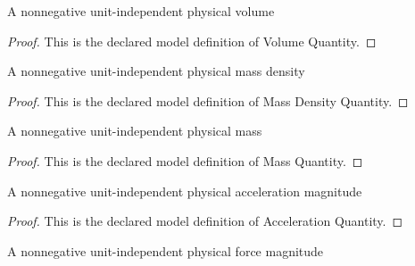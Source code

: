 \begin{definition}
  \label{def:physics:phyx-mini-0722:phyxminiproblems-problemphyxmini0722-volumequantity}
  A nonnegative unit-independent physical volume
\end{definition}
\begin{proof}
  This is the declared model definition of Volume Quantity.
\end{proof}
\begin{definition}
  \label{def:physics:phyx-mini-0722:phyxminiproblems-problemphyxmini0722-massdensityquantity}
  A nonnegative unit-independent physical mass density
\end{definition}
\begin{proof}
  This is the declared model definition of Mass Density Quantity.
\end{proof}
\begin{definition}
  \label{def:physics:phyx-mini-0722:phyxminiproblems-problemphyxmini0722-massquantity}
  A nonnegative unit-independent physical mass
\end{definition}
\begin{proof}
  This is the declared model definition of Mass Quantity.
\end{proof}
\begin{definition}
  \label{def:physics:phyx-mini-0722:phyxminiproblems-problemphyxmini0722-accelerationquantity}
  A nonnegative unit-independent physical acceleration magnitude
\end{definition}
\begin{proof}
  This is the declared model definition of Acceleration Quantity.
\end{proof}
\begin{definition}
  \label{def:physics:phyx-mini-0722:phyxminiproblems-problemphyxmini0722-forcequantity}
  A nonnegative unit-independent physical force magnitude
\end{definition}
